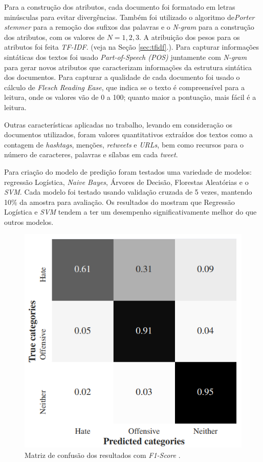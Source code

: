 Para a construção dos atributos, cada documento foi formatado em letras minúsculas para evitar divergências. Também foi utilizado o algoritmo de{\it Porter stemmer} para a remoção dos sufixos das palavras e o {\it N-gram} para a construção dos atributos, com os valores de $N={1,2,3}$. A atribuição dos pesos para os atributos foi feita {\it TF-IDF}. (veja na Seção \ref{sec:tfidf}.). Para capturar informações sintáticas dos textos foi usado {\it Part-of-Speech (POS)} juntamente com {\it N-gram} para gerar novos atributos que caracterizam informações da estrutura sintática dos documentos. Para capturar a qualidade de cada documento foi usado o cálculo de {\it Flesch Reading Ease}, que indica se o texto é compreensível para a leitura, onde os valores vão de 0 a 100; quanto maior a pontuação, mais fácil é a leitura. 

Outras características aplicadas no trabalho, levando em consideração os documentos utilizados, foram valores quantitativos extraídos dos textos como a contagem de \textit{hashtags}, menções, \textit{retweets} e \textit{URLs}, bem como recursos para o número de caracteres, palavras e sílabas em cada \textit{tweet}.

Para criação do modelo de predição foram testados uma variedade de modelos: regressão Logística, \textit{Naive Bayes}, Árvores de Decisão, Florestas Aleatórias e o \textit{SVM}. Cada modelo foi testado usando validação cruzada de 5 vezes, mantendo 10\% da amostra para avaliação. Os resultados do \cite{davidson2017automated} mostram que Regressão Logística e \textit{SVM} tendem a ter um desempenho significativamente melhor do que outros modelos.

\begin{figure}[ht]
  \centering
  \includegraphics[height=0.4\textheight]{figuras/trab1-confusion-matriz.png}
  \caption{Matriz de confusão dos resultados com \textit{F1-Score} \cite{davidson2017automated}.}
  \label{fig:tb1confmatriz}
\end{figure}

